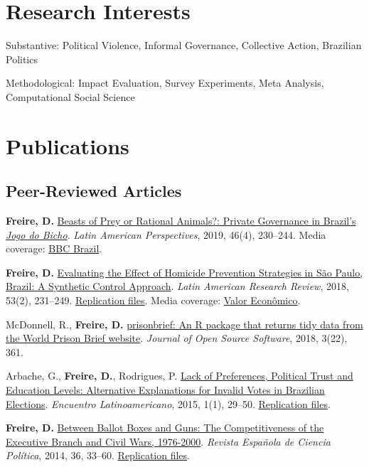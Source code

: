 \documentclass[a4paper]{article}
\renewenvironment{itemize}{
  \begin{list}{}{
    \setlength{\leftmargin}{1.5em}
  }
}{
  \end{list}
}
\begin{document}
\section*{Research Interests}

\begin{itemize}
 	\item Substantive: Political Violence, Informal Governance, Collective Action, Brazilian Politics %
 	\item Methodological: Impact Evaluation, Survey Experiments, Meta Analysis, Computational Social Science 
\end{itemize}

\section*{Publications}

\subsection*{Peer-Reviewed Articles}

\begin{itemize}
	\item \textbf{Freire, D.} \href{https://doi.org/10.1177/0094582X19846519}{Beasts of Prey or Rational Animals?: Private Governance in Brazil's \emph{Jogo do Bicho}}. \textit{Latin American Perspectives}, 2019, 46(4), 230--244. Media coverage: \href{http://www.bbc.com/portuguese/brasil-40140693}{BBC Brazil}.
	\item \textbf{Freire, D.} \href{https://larrlasa.org/articles/10.25222/larr.334/}{Evaluating the Effect of Homicide Prevention Strategies in São Paulo, Brazil: A Synthetic Control Approach}. \textit{Latin American Research Review}, 2018, 53(2), 231--249. \href{https://github.com/danilofreire/homicides-sp-synth}{Replication files}. Media coverage: \href{http://www.valor.com.br/cultura/5111524/sangue-no-asfalto}{Valor Econômico}.
	\item McDonnell, R., \textbf{Freire, D.} \href{https://doi.org/10.21105/joss.00361}{prisonbrief: An R package that returns tidy data from the World Prison Brief website}. \textit{Journal of Open Source Software}, 2018, 3(22), 361. 
	\item Arbache, G., \textbf{Freire, D.}, Rodrigues, P. \href{http://www.iapss.org/wp-content/uploads/2014/10/ELA1.1_2.Lack-of-Preferences-Political-Trust-and-Education-Levels.pdf}{Lack of Preferences, Political Trust and Education Levels: Alternative Explanations for Invalid Votes in Brazilian Elections}. \textit{Encuentro Latinoamericano}, 2015, 1(1), 29--50. \href{https://github.com/danilofreire/invalid-votes-brazil}{Replication files}.
	\item \textbf{Freire, D.} \href{http://recyt.fecyt.es/index.php/recp/article/view/37638}{Between Ballot Boxes and Guns: The Competitiveness of the Executive Branch and Civil Wars, 1976-2000}. \textit{Revista Española de Ciencia Política}, 2014, 36, 33--60. \href{https://doi.org/10.7910/DVN/NSDUYG}{Replication files}.
\end{itemize}
\end{document}
